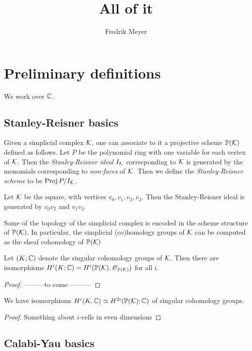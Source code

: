 \documentclass[]{uiophd}
\begin{document}
\title{All of it}
\author{Fredrik Meyer}
\maketitle 

\chapter{Preliminary definitions}

We work over $\mathbb{C}$. 

\section{Stanley-Reisner basics}

Given a simplicial complex $\mathcal K$, one can associate to it a projective scheme $\mathbb{P}(\mathcal K)$ defined as follows. Let $P$ be the polynomial ring with one variable for each vertex of $\mathcal K$. Then the \emph{Stanley-Reisner ideal $I_\mathcal K$} corresponding to $\mathcal K$ is generated by the monomials corresponding to \emph{non-faces} of $\mathcal K$. Then we define the \emph{Stanley-Reisner scheme} to be $\operatorname{Proj} P/I_\mathcal K$. 

\begin{example}
Let $\mathcal K$ be the square, with vertices $v_0,v_1,v_2,v_3$. Then the Stanley-Reisner ideal is generated by $v_0v_2$ and $v_1v_3$.
\end{example}

Some of the topology of the simplicial complex is encoded in the scheme structure of $\mathbb{P}(\mathcal K)$. In particular, the simplicial (co)homology groups of $\mathcal K$ can be computed as the sheaf cohomology of $\mathbb{P}(\mathcal K)$

\begin{lemma}
Let $(K;\mathbb{C})$ denote the singular cohomology groups of $\mathcal K$. Then there are isomorphisms $H^i(K;\mathbb{C})=H^i(\mathbb{P}(\mathcal K),\operatorname{\mathscr{O}}_{\mathbb{P}(\mathcal K)})$ for all $i$.
\end{lemma}
\begin{proof}
---------to come-----------
\end{proof}

\begin{corr}
We have isomorphisms $H^i(K,\mathbb{C}) \simeq H^{2i}(\mathbb{P}(\mathcal K);\mathbb{C})$ of singular cohomology groups.
\end{corr}
\begin{proof}
Something about $i$-cells in even dimensions
\end{proof}

\section{Calabi-Yau basics}
\end{document}
